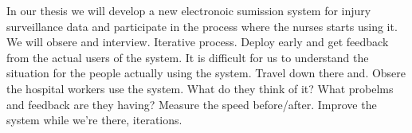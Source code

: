 \documentclass[UKenglish]{article}
\begin{document}
In our thesis we will develop a new electronoic sumission system for injury surveillance data and participate in the process where the nurses starts using it. We will obsere and interview. Iterative process. Deploy early and get feedback from the actual users of the system. It is difficult for us to understand the situation for the people actually using the system. Travel down there and. Obsere the hospital workers use the system. What do they think of it? What probelms and feedback are they having? Measure the speed before/after. Improve the system while we're there, iterations.
\end{document}

